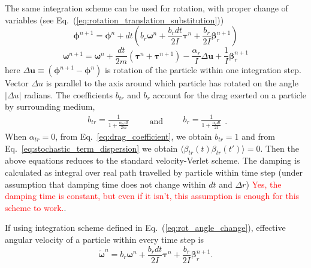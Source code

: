 The same integration scheme can be used for rotation, with proper change of variables (see Eq.~(\ref{eq:rotation_translation_substitution}))
\begin{equation}
\label{eq:rot_angle_change}
	\boldsymbol{\phi}^{n+1} = \boldsymbol{\phi}^n + dt \left(
		  b_{r} \boldsymbol{\omega}^n
		  + \frac{b_{r} dt}{2I}\boldsymbol{\tau}^n
		  + \frac{b_{r} }{2I}\boldsymbol{\beta}_{r}^{n+1}
	 \right)
\end{equation}
\begin{equation}
\label{eq:rot_ang_velocity_change}
	\boldsymbol{\omega}^{n+1} = \boldsymbol{\omega}^n
	+ \frac{dt}{2m}\left(
		\boldsymbol{\tau}^n + \boldsymbol{\tau}^{n+1}
	\right)
	- \frac{\alpha_{r}}{I}\Delta \boldsymbol{u}
	+ \frac{1}{I}\boldsymbol{\beta}_{r}^{n+1}
\end{equation}
here $\Delta \boldsymbol{u} \equiv \left(\boldsymbol{\phi}^{n+1} - \boldsymbol{\phi}^n\right)$ is rotation of the particle within one integration step. Vector $\Delta u$ is parallel to the axis around which particle has rotated on the angle $|\Delta u|$ radians. The coefficients $b_{tr}$ and $b_{r}$ account for the drag exerted on a particle by surrounding medium,
\begin{equation}
\label{eq:drag_coefficient}
	\begin{aligned}
		b_{tr} = \frac{1}{1 + \frac{\alpha_{tr} dt}{2 m}}
	\end{aligned}
	\qquad
	\text{and}
	\qquad
	\begin{aligned}
		b_r = \frac{1}{1 + \frac{\alpha_r dt}{2 I}}
	\end{aligned}
	.
\end{equation}
When $\alpha_{tr} = 0$, from Eq.~\eqref{eq:drag_coefficient}, we obtain $b_{tr} = 1$ and from Eq.~\eqref{eq:stochastic_term_dispersion} we obtain $\langle\beta_{tr}(t)\beta_{tr}(t')\rangle = 0$. Then the above equations reduces to the standard velocity-Verlet scheme. The damping is calculated as integral  over real path travelled by particle within time step (under assumption that damping time does not change within $dt$ and $\Delta r$) \textcolor{red}{Yes, the damping time is constant, but even if it isn't, this assumption is enough for this scheme to work.}.

If using integration scheme defined in Eq.~(\ref{eq:rot_angle_change}), effective angular velocity of a particle within every time step is
\begin{equation}
\label{eq:effective_angular_velocity}
	\tilde{\boldsymbol{\omega}}^n = b_{r} \boldsymbol{\omega}^n
	+ \frac{b_{r} dt}{2I}\boldsymbol{\tau}^n
	+ \frac{b_{r} }{2I}\boldsymbol{\beta}_{r}^{n+1}.
\end{equation}

